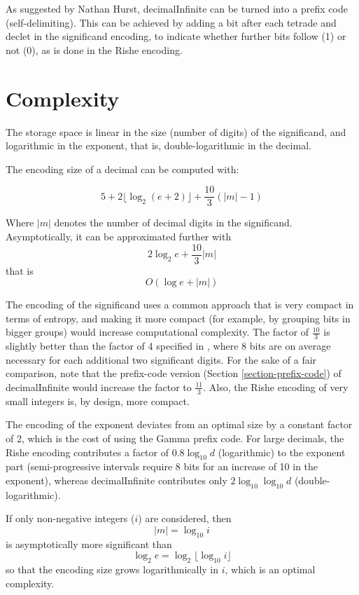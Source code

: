 \documentclass[final,leqno,onefignum,onetabnum]{siamltex1213}
\begin{document}
As suggested by Nathan Hurst, decimalInfinite can be turned into a prefix code (self-delimiting). This can be achieved by adding a bit after each tetrade and declet in the significand encoding, to indicate whether further bits follow (1) or not (0), as is done in the Rishe encoding.

\section{Complexity}
\label{section-complexity}
The storage space is linear in the size (number of digits) of the significand, and logarithmic in the exponent, that is, double-logarithmic in the decimal.

The encoding size of a decimal can be computed with:

$$5 + 2 \lfloor\log_2 (e+2)\rfloor + \frac{10}{3} (|m|-1)$$

Where $|m|$ denotes the number of decimal digits in the significand. Asymptotically, it can be approximated further with $$2 \log_2 e + \frac{10}{3}|m|$$ that is $$O(\log e + |m|)$$

The encoding of the significand uses a common approach that is very compact in terms of entropy, and making it more compact (for example, by grouping bits in bigger groups) would increase computational complexity. The factor of $\frac{10}{3}$ is slightly better than the factor of 4 specified in \cite{Rishe1992}, where 8 bits are on average necessary for each additional two significant digits. For the sake of a fair comparison, note that the prefix-code version (Section \ref{section-prefix-code}) of decimalInfinite would increase the factor to $\frac{11}{3}$. Also, the Rishe encoding of very small integers is, by design, more compact.

The encoding of the exponent deviates from an optimal size by a constant factor of 2, which is the cost of using the Gamma prefix code. For large decimals, the Rishe encoding contributes a factor of $0.8 \log_{10} d$ (logarithmic) to the exponent part (semi-progressive intervals require 8 bits for an increase of 10 in the exponent), whereas decimalInfinite contributes only $2 \log_{10}\log_{10} d$ (double-logari\-thmic).

If only non-negative integers ($i$) are considered, then $$|m|= \log_{10} i$$ is asymptotically more significant than $$\log_2 e=\log_2\lfloor\log_{10} i\rfloor$$ so that the encoding size grows logarithmically in $i$, which is an optimal complexity.


\end{document}
